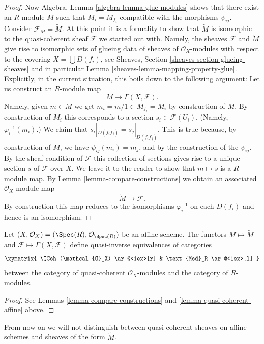 \begin{proof}
\medskip\noindent
Now Algebra, Lemma \ref{algebra-lemma-glue-modules}
shows that there exist an $R$-module $M$ such that
$M_i = M_{f_i}$ compatible with the morphisms $\psi_{ij}$.
Consider $\mathcal{F}_M = \widetilde M$. At this point it is
a formality to show that $\widetilde M$ is isomorphic to
the quasi-coherent sheaf $\mathcal{F}$ we started out with.
Namely, the sheaves $\mathcal{F}$ and $\widetilde M$ give
rise to isomorphic sets of glueing data of sheaves of $\mathcal{O}_X$-modules
with respect to the covering $X = \bigcup D(f_i)$, see
Sheaves, Section \ref{sheaves-section-glueing-sheaves}
and in particular Lemma \ref{sheaves-lemma-mapping-property-glue}.
Explicitly, in the current situation, this boils down to
the following argument: Let us construct an $R$-module map
$$
M \longrightarrow \Gamma(X, \mathcal{F}).
$$
Namely, given $m \in M$ we get $m_i = m/1 \in M_{f_i} = M_i$
by construction of $M$. By construction of $M_i$ this corresponds
to a section $s_i \in \mathcal{F}(U_i)$. (Namely, $\varphi^{-1}_i(m_i)$.)
We claim that $s_i|_{D(f_if_j)} = s_j|_{D(f_if_j)}$. This is
true because, by construction of $M$, we have $\psi_{ij}(m_i) = m_j$,
and by the construction of the $\psi_{ij}$. By the sheaf condition of
$\mathcal{F}$ this collection of sections gives rise to a unique
section $s$ of $\mathcal{F}$ over $X$. We leave it to the reader
to show that $m \mapsto s$ is a $R$-module map.
By Lemma \ref{lemma-compare-constructions} we obtain an associated
$\mathcal{O}_X$-module map
$$
\widetilde M \longrightarrow \mathcal{F}.
$$
By construction this map reduces to the isomorphisms
$\varphi_i^{-1}$ on each $D(f_i)$ and hence is an isomorphism.
\end{proof}

\begin{lemma}
\label{lemma-equivalence-quasi-coherent}
Let $(X, \mathcal{O}_X) = (\Spec(R), \mathcal{O}_{\Spec(R)})$
be an affine scheme.
The functors $M \mapsto \widetilde M$ and
$\mathcal{F} \mapsto \Gamma(X, \mathcal{F})$ define quasi-inverse
equivalences of categories
$$
\xymatrix{
\QCoh(\mathcal{O}_X)
\ar@<1ex>[r]
&
\text{Mod}_R
\ar@<1ex>[l]
}
$$
between the category of quasi-coherent $\mathcal{O}_X$-modules
and the category of $R$-modules.
\end{lemma}

\begin{proof}
See Lemmas \ref{lemma-compare-constructions}
and \ref{lemma-quasi-coherent-affine} above.
\end{proof}

\noindent
From now on we will not distinguish between quasi-coherent
sheaves on affine schemes and sheaves of the form $\widetilde M$.


